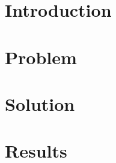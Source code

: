 
\section{Introduction}
\label{sec:introduction}

\clearpage
\section{Problem}
\label{sec:problem}
	

\clearpage
\section{Solution}
\label{sec:approach}


\clearpage
\section{Results}
\label{sec:results}


%